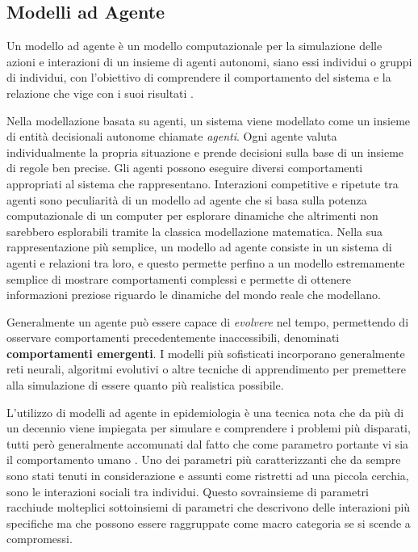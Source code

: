 \subsection{Modelli ad Agente}
Un modello ad agente è un modello computazionale per la simulazione delle 
azioni e interazioni di un insieme di agenti autonomi, siano essi individui
o gruppi di individui, con l'obiettivo di comprendere il comportamento 
del sistema e la relazione che vige con i suoi risultati \cite{7822080}.

Nella modellazione basata su agenti, un sistema viene modellato come un insieme 
di entità decisionali autonome chiamate \emph{agenti}. Ogni agente valuta 
individualmente la propria situazione e prende decisioni sulla base di un insieme di 
regole ben precise. Gli agenti possono eseguire diversi comportamenti appropriati
al sistema che rappresentano. Interazioni competitive e ripetute tra agenti sono 
peculiarità di un modello ad agente che si basa sulla potenza computazionale di un 
computer per esplorare dinamiche che altrimenti non sarebbero esplorabili tramite la 
classica modellazione matematica. Nella sua rappresentazione più semplice, un modello 
ad agente consiste in un sistema di agenti e relazioni tra loro, e questo permette 
perfino a un modello estremamente semplice di mostrare comportamenti complessi e 
permette di ottenere informazioni preziose riguardo le dinamiche del mondo reale che
modellano. 

Generalmente un agente può essere capace di \emph{evolvere} nel tempo, permettendo 
di osservare comportamenti precedentemente inaccessibili, denominati \textbf{comportamenti emergenti}.
I modelli più sofisticati incorporano generalmente reti neurali, algoritmi evolutivi o 
altre tecniche di apprendimento per premettere alla simulazione di essere quanto più 
realistica possibile.

L'utilizzo di modelli ad agente in epidemiologia è una tecnica nota che 
da più di un decennio viene impiegata per simulare e comprendere 
i problemi più disparati, tutti però generalmente accomunati
dal fatto che come parametro portante vi sia il comportamento umano \cite{Groff2019}
\cite{El-Sayed2012-ac} \cite{Tracy2018-lc} \cite{Bissett2021}. 
Uno dei parametri più caratterizzanti che da sempre sono stati tenuti 
in considerazione e assunti come ristretti ad una piccola cerchia, sono 
le interazioni sociali tra individui. Questo sovrainsieme di parametri 
racchiude molteplici sottoinsiemi di parametri che descrivono delle 
interazioni più specifiche ma che possono essere raggruppate come macro 
categoria se si scende a compromessi. 

